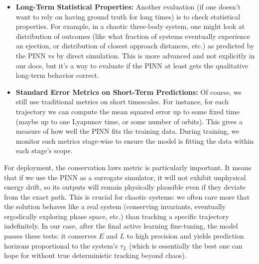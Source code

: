 \begin{itemize}
    \item \textbf{Long-Term Statistical Properties:} Another evaluation (if one doesn't want to rely on having ground truth for long times) is to check statistical properties.  For example, in a chaotic three-body system, one might look at distribution of outcomes (like what fraction of systems eventually experience an ejection, or distribution of closest approach distances, etc.) as predicted by the PINN vs by direct simulation.  This is more advanced and not explicitly in our docs, but it's a way to evaluate if the PINN at least gets the qualitative long-term behavior correct. 
    
    
    
    
    
    
    \item \textbf{Standard Error Metrics on Short-Term Predictions:} Of course, we still use traditional metrics on short timescales.  For instance, for each trajectory we can compute the mean squared error up to some fixed time (maybe up to one Lyapunov time, or some number of orbits).  This gives a measure of how well the PINN fits the training data.  During training, we monitor such metrics stage-wise to ensure the model is fitting the data within each stage's scope. 
\end{itemize}

For deployment, the conservation laws metric is particularly important. It means that if we use the PINN as a surrogate simulator, it will not exhibit unphysical energy drift, so its outputs will remain physically plausible even if they deviate from the exact path.  This is crucial for chaotic systems: we often care more that the solution behaves like a real system (conserving invariants, eventually ergodically exploring phase space, etc.) than tracking a specific trajectory indefinitely.  In our case, after the final active learning fine-tuning, the model passes these tests: it conserves $E$ and $L$ to high precision and yields prediction horizons proportional to the system's $\tau_L$ (which is essentially the best one can hope for without true deterministic tracking beyond chaos). 



